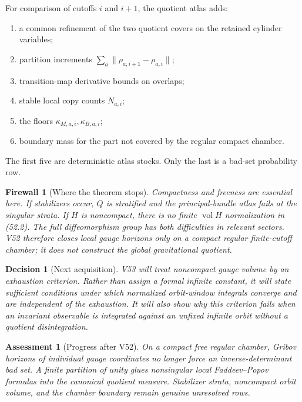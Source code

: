 \documentclass[11pt]{article}
\newtheorem{assessment}[theorem]{Assessment}
\newtheorem{firewall}[theorem]{Firewall}
\newtheorem{decision}[theorem]{Decision}
\begin{document}
\begin{ledger}
\label{led:v11v52-adjacent}
For comparison of cutoffs \(i\) and \(i+1\), the quotient atlas adds:
\begin{enumerate}
\item a common refinement of the two quotient covers on the retained
cylinder variables;
\item partition increments
\(\sum_a\lVert\rho_{a,i+1}-\rho_{a,i}\rVert\);
\item transition-map derivative bounds on overlaps;
\item stable local copy counts \(N_{a,i}\);
\item the floors \(\kappa_{M,a,i},\kappa_{B,a,i}\);
\item boundary mass for the part not covered by the regular compact
chamber.
\end{enumerate}
The first five are deterministic atlas stocks.  Only the last is a
bad-set probability row.
\end{ledger}

\begin{firewall}[Where the theorem stops]
\label{fire:v11v52-boundary}
Compactness and freeness are essential here.  If stabilizers occur,
\(Q\) is stratified and the principal-bundle atlas fails at the
singular strata.  If \(H\) is noncompact, there is no finite
\(\operatorname{vol}H\) normalization in (52.2).  The full
diffeomorphism group has both difficulties in relevant sectors.  V52
therefore closes local gauge horizons only on a compact regular
finite-cutoff chamber; it does not construct the global gravitational
quotient.
\end{firewall}

\begin{decision}[Next acquisition]
\label{dec:v11v52-next}
V53 will treat noncompact gauge volume by an exhaustion criterion.
Rather than assign a formal infinite constant, it will state sufficient
conditions under which normalized orbit-window integrals converge and
are independent of the exhaustion.  It will also show why this
criterion fails when an invariant observable is integrated against an
unfixed infinite orbit without a quotient disintegration.
\end{decision}

\begin{assessment}[Progress after V52]
\label{ass:v11v52-status}
On a compact free regular chamber, Gribov horizons of individual gauge
coordinates no longer force an inverse-determinant bad set.  A finite
partition of unity glues nonsingular local Faddeev--Popov formulas into
the canonical quotient measure.  Stabilizer strata, noncompact orbit
volume, and the chamber boundary remain genuine unresolved rows.
\end{assessment}
\end{document}

